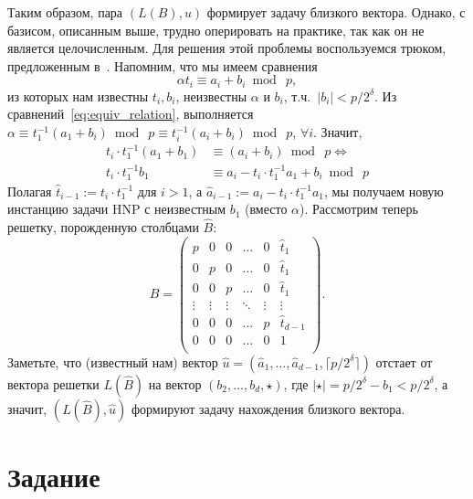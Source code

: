 \documentclass[11pt]{exam}
\theoremstyle{definition}
\begin{document}
{	Таким образом, пара $(L(B),u)$ формирует задачу близкого вектора. Однако, с базисом, описанным выше, трудно оперировать на практике, так как он не является целочисленным. Для решения этой проблемы воспользуемся трюком, предложенным в~\cite{AH}. Напомним, что мы имеем сравнения
	\begin{equation} \label{eq:equiv_relation}
		\alpha t_i \equiv a_i + b_i \bmod~p,
	\end{equation}
	из которых нам известны $t_i, b_i$, неизвестны $\alpha$ и $b_i$, т.ч.\ $|b_i|< p/2^\delta$. Из сравнений~\eqref{eq:equiv_relation}, выполняется $\alpha \equiv t_1^{-1}(a_1 +b_i)\bmod~p \equiv t_i^{-1}(a_i +b_i)\bmod~p$, $\forall i$. Значит,
	\begin{align*}
		t_i \cdot t_1^{-1}(a_1 +b_1) &\equiv (a_i +b_i) \bmod~p \iff  \\
		t_i \cdot t_1^{-1} b_1 & \equiv a_i -  t_i \cdot t_1^{-1}a_1 + b_i \bmod~p 
	\end{align*}
	Полагая $\hat{t}_{i-1}:= t_i\cdot t_1^{-1}$ для $i>1$, а $\hat{a}_{i-1}:= a_i -  t_i \cdot t_1^{-1}a_1$, мы получаем новую инстанцию задачи HNP с неизвестным $b_1$ (вместо $\alpha$). Рассмотрим теперь решетку, порожденную столбцами $\hat{B}$:
	\[
	\hat{B} = \begin{pmatrix}
	p & 0 & 0 & \ldots & 0 & \hat{t}_1 \\
	0 & p & 0 & \ldots & 0 & \hat{t}_1 \\
	0 & 0 & p & \ldots & 0 & \hat{t}_1 \\
	\vdots & \vdots & \vdots & \ddots & \vdots & \vdots \\
	0 & 0 & 0 & \ldots & p & \hat{t}_{d-1} \\
	0 & 0 & 0 & \ldots & 0 & 1 \\
	\end{pmatrix}.
	\]
	Заметьте, что (известный нам) вектор $\hat{u} = (\hat{a}_1, \ldots, \hat{a}_{d-1},  \lceil p/2^\delta \rceil)$ отстает от вектора решетки $L(\hat{B})$ на вектор $(b_2, \ldots, b_d, \star)$, где $|\star| = p/2^\delta - b_1 <p/2^\delta$, а значит, $(L(\hat{B}), \hat{u})$ формируют задачу нахождения близкого вектора.
	
		
	
	\section{Задание}
	
}
\end{document}
